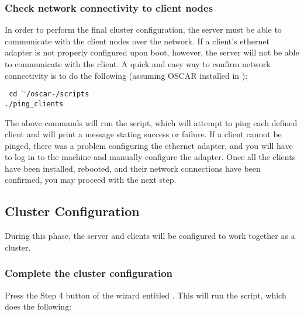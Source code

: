 \subsubsection{Check network connectivity to client nodes}
\label{det:pingclients}

In order to perform the final cluster configuration, the server must
be able to communicate with the client nodes over the network. If a
client's ethernet adapter is not properly configured upon boot,
however, the server will not be able to communicate with the client. A
quick and easy way to confirm network connectivity is to do the
following (assuming OSCAR installed in ):

\vspace{11pt}
{\tt
  cd $^\sim$/oscar-\oscarversion/scripts \\
\indent  ./ping\_clients
}
\vspace{11pt}

The above commands will run the  script, which will
attempt to ping each defined client and will print a message stating
success or failure. If a client cannot be pinged, there was a problem
configuring the ethernet adapter, and you will have to log in to the
machine and manually configure the adapter. Once all the clients have
been installed, rebooted, and their network connections have been
confirmed, you may proceed with the next step.


\subsection{Cluster Configuration}

During this phase, the server and clients will be configured to work
together as a cluster.

\subsubsection{Complete the cluster configuration}
\label{det:completeinstall}

Press the Step 4 button of the wizard entitled .  This will run the  script,
which does the following:

